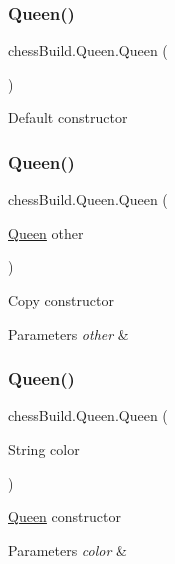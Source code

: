 \subsubsection{\texorpdfstring{Queen()}{Queen()}\hspace{0.1cm}{\footnotesize\ttfamily [1/4]}}
{\footnotesize\ttfamily chess\+Build.\+Queen.\+Queen (\begin{DoxyParamCaption}{ }\end{DoxyParamCaption})}

Default constructor \mbox{\label{classchess_build_1_1_queen_a6569f23986b77bf85faeac5f15661a6c}} 
\subsubsection{\texorpdfstring{Queen()}{Queen()}\hspace{0.1cm}{\footnotesize\ttfamily [2/4]}}
{\footnotesize\ttfamily chess\+Build.\+Queen.\+Queen (\begin{DoxyParamCaption}\item[{\hyperlink{classchess_build_1_1_queen}{Queen}}]{other }\end{DoxyParamCaption})}

Copy constructor 
\begin{DoxyParams}{Parameters}
{\em other} & \\
\hline
\end{DoxyParams}
\mbox{\label{classchess_build_1_1_queen_a142d6ff4a3adb06f4594d0e91549ad92}} 
\subsubsection{\texorpdfstring{Queen()}{Queen()}\hspace{0.1cm}{\footnotesize\ttfamily [3/4]}}
{\footnotesize\ttfamily chess\+Build.\+Queen.\+Queen (\begin{DoxyParamCaption}\item[{String}]{color }\end{DoxyParamCaption})}

\hyperlink{classchess_build_1_1_queen}{Queen} constructor 
\begin{DoxyParams}{Parameters}
{\em color} & \\
\hline
\end{DoxyParams}
\mbox{\label{classchess_build_1_1_queen_a205a888b7cd5393711634e4e6f39fe5e}} 
